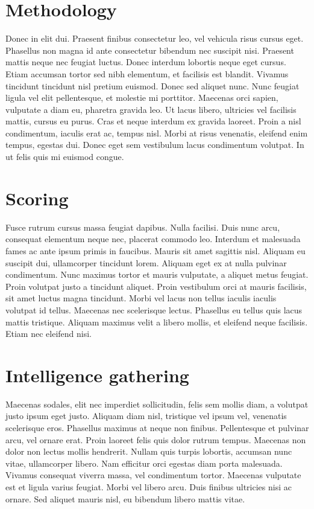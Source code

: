 \section{Methodology}
Donec in elit dui. Praesent finibus consectetur leo, vel vehicula risus cursus eget. Phasellus non magna id ante consectetur bibendum nec suscipit nisi. Praesent mattis neque nec feugiat luctus. Donec interdum lobortis neque eget cursus. Etiam accumsan tortor sed nibh elementum, et facilisis est blandit. Vivamus tincidunt tincidunt nisl pretium euismod. Donec sed aliquet nunc. Nunc feugiat ligula vel elit pellentesque, et molestie mi porttitor. Maecenas orci sapien, vulputate a diam eu, pharetra gravida leo. Ut lacus libero, ultricies vel facilisis mattis, cursus eu purus. Cras et neque interdum ex gravida laoreet. Proin a nisl condimentum, iaculis erat ac, tempus nisl. Morbi at risus venenatis, eleifend enim tempus, egestas dui. Donec eget sem vestibulum lacus condimentum volutpat. In ut felis quis mi euismod congue.

\section{Scoring}
Fusce rutrum cursus massa feugiat dapibus. Nulla facilisi. Duis nunc arcu, consequat elementum neque nec, placerat commodo leo. Interdum et malesuada fames ac ante ipsum primis in faucibus. Mauris sit amet sagittis nisl. Aliquam eu suscipit dui, ullamcorper tincidunt lorem. Aliquam eget ex at nulla pulvinar condimentum. Nunc maximus tortor et mauris vulputate, a aliquet metus feugiat. Proin volutpat justo a tincidunt aliquet. Proin vestibulum orci at mauris facilisis, sit amet luctus magna tincidunt. Morbi vel lacus non tellus iaculis iaculis volutpat id tellus. Maecenas nec scelerisque lectus. Phasellus eu tellus quis lacus mattis tristique. Aliquam maximus velit a libero mollis, et eleifend neque facilisis. Etiam nec eleifend nisi.

\section{Intelligence gathering}
Maecenas sodales, elit nec imperdiet sollicitudin, felis sem mollis diam, a volutpat justo ipsum eget justo. Aliquam diam nisl, tristique vel ipsum vel, venenatis scelerisque eros. Phasellus maximus at neque non finibus. Pellentesque et pulvinar arcu, vel ornare erat. Proin laoreet felis quis dolor rutrum tempus. Maecenas non dolor non lectus mollis hendrerit. Nullam quis turpis lobortis, accumsan nunc vitae, ullamcorper libero. Nam efficitur orci egestas diam porta malesuada. Vivamus consequat viverra massa, vel condimentum tortor. Maecenas vulputate est et ligula varius feugiat. Morbi vel libero arcu. Duis finibus ultricies nisi ac ornare. Sed aliquet mauris nisl, eu bibendum libero mattis vitae.

